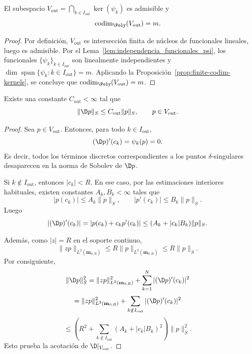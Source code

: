 \begin{lem}\label{lem:vout_codimension}
	El subespacio $V_{\mathrm{out}}=\bigcap_{k\in I_{\mathrm{out}}}\ker(\psi_k)$ es admisible y
	\[
		\operatorname{codim}_{\Poly}(V_{\mathrm{out}})=m.
	\]
\end{lem}
\begin{proof}
	Por definición, $V_{\mathrm{out}}$ es intersección finita de núcleos de funcionales lineales, luego es admisible. Por el Lema~\ref{lem:independencia_funcionales_psi}, los funcionales $\{\psi_k\}_{k\in I_{\mathrm{out}}}$ son linealmente independientes y
	$\dim\operatorname{span}\{\psi_k:k\in I_{\mathrm{out}}\}=m$.
	Aplicando la Proposición~\ref{prop:finite-codim-kernels}, se concluye que
	$\operatorname{codim}_{\Poly}(V_{\mathrm{out}})=m$.
\end{proof}

\begin{lem}\label{lem:vout_acotacion}
	Existe una constante $C_{\mathrm{out}}<\infty$ tal que
	\[
		\|\D p\|_S\le C_{\mathrm{out}}\|p\|_S,\qquad p\in V_{\mathrm{out}}.
	\]
\end{lem}
\begin{proof}
	Sea $p\in V_{\mathrm{out}}$. Entonces, para todo $k\in I_{\mathrm{out}}$,
	\[
		(\D p)'(c_k)=\psi_k(p)=0.
	\]
	Es decir, todos los términos discretos correspondientes a los puntos $\delta$-singulares
	desaparecen en la norma de Sobolev de $\D p$.

	Si $k\notin I_{\mathrm{out}}$, entonces $|c_k|<R$. En ese caso, por las estimaciones
	interiores habituales, existen constantes $A_k,B_k<\infty$ tales que
	\[
		|p(c_k)|\le A_k\|p\|_S,
		\qquad
		|p'(c_k)|\le B_k\|p\|_S.
	\]
	Luego
	\[
		|(\D p)'(c_k)|
		=
		|p(c_k)+c_kp'(c_k)|
		\le
		(A_k+|c_k|B_k)\|p\|_S.
	\]

	Además, como $|z|=R$ en el soporte continuo,
	\[
		\|zp\|_{L^2(\mathbf{m}_{0;R})}\le R\|p\|_{L^2(\mathbf{m}_{0;R})}\le R\|p\|_S.
	\]
	Por consiguiente,
	\[
		\|\D p\|_S^2
		=
		\|zp\|_{L^2(\mathbf{m}_{0;R})}^2
		+
		\sum_{k=1}^N |(\D p)'(c_k)|^2
	\]
	\[
		=
		\|zp\|_{L^2(\mathbf{m}_{0;R})}^2
		+
		\sum_{k\notin I_{\mathrm{out}}} |(\D p)'(c_k)|^2
	\]
	\[
		\le
		\left(
		R^2+\sum_{k\notin I_{\mathrm{out}}}(A_k+|c_k|B_k)^2
		\right)\|p\|_S^2.
	\]
	Esto prueba la acotación de $\D|_{V_{\mathrm{out}}}$.
\end{proof}

